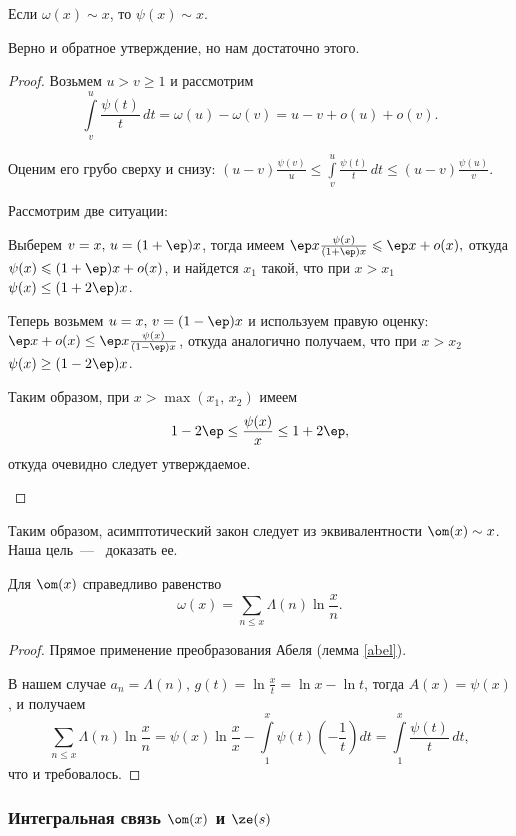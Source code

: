\begin{stm}
Если $\omega(x) \sim x$, то $\psi(x) \sim x$.
\end{stm}
\begin{note}
Верно и обратное утверждение, но нам достаточно этого.
\end{note}
\begin{proof}
Возьмем $u > v \geqslant 1$ и рассмотрим
$$
	\int\limits_v^u \frac{\psi(t)}{t}\,dt =\omega(u) - \omega(v) = 
	u - v + o(u) + o(v).
$$

Оценим его грубо сверху и снизу:
$(u-v)\frac{\psi(v)}{u} \leqslant \int\limits_v^u \frac{\psi(t)}{t}\,dt 
\leqslant (u-v)\frac{\psi(u)}{v}.$

Рассмотрим две ситуации:
\begin{points}{0}
\item Выберем $v = x,\,u = (1+\ep)x$, тогда имеем 
	$\ep x\frac{\psi(x)}{(1+\ep)x} \leqslant \ep x + o(x),$
	откуда $\psi(x) \leqslant (1+\ep)x + o(x)$, и найдется $x_1$ такой, 
	что при $x>x_1$ $\psi(x)\le(1+2\ep)x$.

\item Теперь возьмем $u = x,\,v = (1 - \ep)x$ и используем правую оценку: 
	$\ep x + o(x) \le \ep x\frac{\psi(x)}{(1-\ep)x}$, откуда аналогично  
	получаем, что при $x>x_2$ $\psi(x)\ge(1-2\ep)x$.

	Таким образом, при $x>\max{(x_1,\,x_2)}$ имеем
	$$
		1 - 2\ep \le \frac{\psi(x)}{x} \le 1 + 2\ep,
	$$
	откуда очевидно следует утверждаемое.
\end{points}
\end{proof}

Таким образом, асимптотический закон следует из эквивалентности $\om(x)\sim x$.
Наша цель~—~ доказать ее.

\begin{stm} Для $\om(x)$ справедливо равенство
$$\omega(x) = \sum\limits_{n\leqslant x} \Lambda(n) \ln\frac{x}{n}.$$
\end{stm}
\begin{proof}
Прямое применение преобразования Абеля (лемма \ref{abel}).\par
В нашем случае $a_n = \Lambda(n),\,g(t) = \ln\frac{x}{t} = \ln x - \ln t$, тогда $A(x) = \psi(x)$, и получаем
$$\sum\limits_{n\leqslant x} \Lambda(n)\ln\frac{x}{n} = \psi(x)\ln\frac{x}{x} - \int\limits_1^x \psi(t)\left(-\frac{1}{t}\right)dt = \int\limits_1^x \frac{\psi(t)}t\,dt,$$ что и требовалось.
\end{proof}

\subsubsection{Интегральная связь $\om(x)$ и $\ze(s)$}

